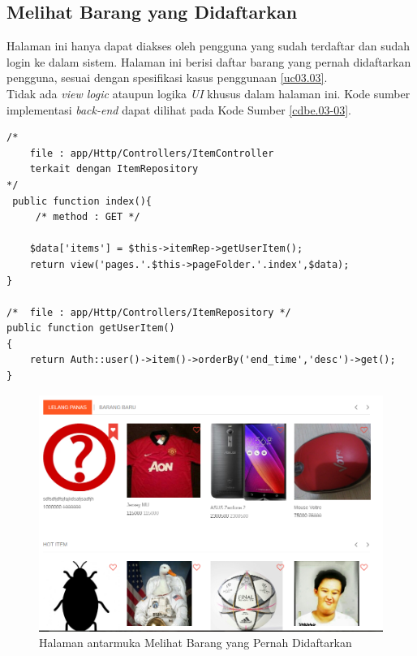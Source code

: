 \subsection{Melihat Barang yang Didaftarkan}
Halaman ini hanya dapat diakses oleh pengguna yang sudah terdaftar dan sudah login ke dalam sistem. Halaman ini berisi daftar barang yang pernah didaftarkan pengguna, sesuai dengan spesifikasi kasus penggunaan \ref{uc03.03}.\\
\indent Tidak ada \textit{view logic} ataupun logika \textit{UI} khusus dalam halaman ini. Kode sumber implementasi \textit{back-end} dapat dilihat pada Kode Sumber \ref{cdbe.03-03}.

\begin{lstlisting}[label=cdbe.03-03,style=php,caption=Kode Sumber \textit{Back-end} Melihat Barang yang Pernah Didaftarkan]
/*	
	file : app/Http/Controllers/ItemController
	terkait dengan ItemRepository
*/
 public function index(){
	 /*	method : GET */
	
    $data['items'] = $this->itemRep->getUserItem();
    return view('pages.'.$this->pageFolder.'.index',$data);
}

/*	file : app/Http/Controllers/ItemRepository */
public function getUserItem()
{
    return Auth::user()->item()->orderBy('end_time','desc')->get();
}
\end{lstlisting}

\begin{figure}[H]
	\centering
	\includegraphics[width=\textwidth]{images/bab4/ui/02-01.png}
	\caption{Halaman antarmuka Melihat Barang yang Pernah Didaftarkan}
	\label{ui.02-01}
\end{figure}

